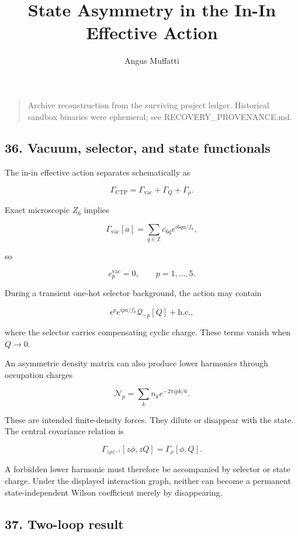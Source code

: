 \documentclass[
]{article}
\title{State Asymmetry in the In-In Effective Action}
\author{Angus Muffatti}
\date{}
\begin{document}
\maketitle

\begin{quote}
Archive reconstruction from the surviving project ledger. Historical
sandbox binaries were ephemeral; see RECOVERY\_PROVENANCE.md.
\end{quote}

\hypertarget{vacuum-selector-and-state-functionals}{%
\subsection{36. Vacuum, selector, and state
functionals}\label{vacuum-selector-and-state-functionals}}

The in-in effective action separates schematically as

\[
\Gamma_{\mathrm{CTP}}
=\Gamma_{\mathrm{vac}}+\Gamma_Q+\Gamma_\rho.
\]

Exact microscopic \(Z_6\) implies

\[
\Gamma_{\mathrm{vac}}[a]
=\sum_{q\in\mathbb Z}c_{6q}e^{i6qa/f_a},
\]

so

\[
c_p^{\mathrm{vac}}=0,
\qquad p=1,\ldots,5.
\]

During a transient one-hot selector background, the action may contain

\[
\epsilon^p e^{ipa/f_a}\mathcal Q_{-p}[Q]+\mathrm{h.c.},
\]

where the selector carries compensating cyclic charge. These terms
vanish when \(Q\rightarrow0\).

An asymmetric density matrix can also produce lower harmonics through
occupation charges

\[
\mathcal N_p=\sum_kn_ke^{-2\pi ipk/6}.
\]

These are intended finite-density forces. They dilute or disappear with
the state. The central covariance relation is

\[
\Gamma_{z\rho z^{-1}}[z\phi,zQ]
=\Gamma_\rho[\phi,Q].
\]

A forbidden lower harmonic must therefore be accompanied by selector or
state charge. Under the displayed interaction graph, neither can become
a permanent state-independent Wilson coefficient merely by disappearing.

\hypertarget{two-loop-result}{%
\subsection{37. Two-loop result}\label{two-loop-result}}
\end{document}
